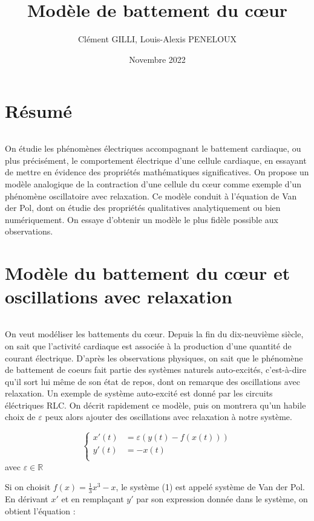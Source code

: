 \documentclass{article}
\title{{\myfont Modèle de battement du cœur}}
\author{Clément GILLI, Louis-Alexis PENELOUX }
\date{Novembre 2022}
\begin{document}
\maketitle

\section{Résumé}

\[\]

On étudie les phénomènes électriques accompagnant le battement cardiaque, ou
plus précisément, le comportement électrique d’une cellule cardiaque, en essayant de mettre en
évidence des propriétés mathématiques significatives. On propose un modèle analogique de la contraction
d’une cellule du cœur comme exemple d’un phénomène oscillatoire avec relaxation. Ce
modèle conduit à l’équation de Van der Pol, dont on étudie des propriétés qualitatives analytiquement ou bien numériquement.
On essaye d'obtenir un modèle le plus fidèle possible aux observations.

\section{Modèle du battement du cœur et oscillations avec relaxation}

\[\]

On veut modéliser les battements du cœur. Depuis la fin du dix-neuvième siècle, on sait que l’activité cardiaque est associée à la production d’une quantité de courant électrique.
D'après les observations physiques, on sait que le phénomène de battement de coeurs fait partie des systèmes naturels auto-excités, c'est-à-dire qu'il sort lui même de son état de repos, dont on remarque des oscillations avec relaxation. Un exemple de système auto-excité est donné par les circuits éléctriques  RLC. On décrit rapidement ce modèle, puis on montrera qu'un habile choix de $\varepsilon$ peux alors ajouter des oscillations avec relaxation à notre système.


\begin{equation}
   \left\{
   \begin{aligned}
        x'(t) &= \varepsilon (y(t) - f(x(t)))\\   
        y'(t) &= -x(t)\\
   \end{aligned}
   \right.
\end{equation}
avec $\varepsilon \in \mathbb{R}$


Si on choisit \(f(x) = \frac{1}{3} x^3 - x\), le système (1) est appelé système de Van der Pol. En dérivant $x'$ et en remplaçant $y'$ par son expression donnée dans le système, on obtient l'équation :
\end{document}
